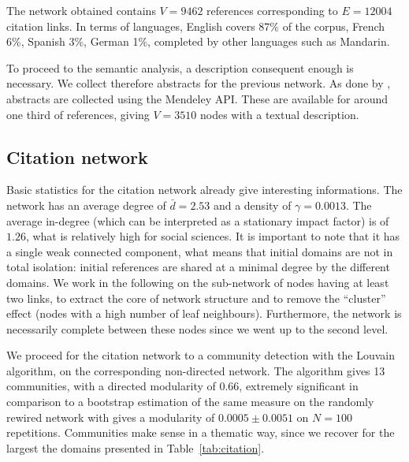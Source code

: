 \documentclass[10pt]{article}
\begin{document}
The network obtained contains $V=9462$ references corresponding to $E=12004$ citation links. In terms of languages, English covers 87\% of the corpus, French 6\%, Spanish 3\%, German 1\%, completed by other languages such as Mandarin.


To proceed to the semantic analysis, a description consequent enough is necessary. We collect therefore abstracts for the previous network. As done by \cite{raimbault2019exploration}, abstracts are collected using the Mendeley API. These are available for around one third of references, giving $V=3510$ nodes with a textual description.

\subsection{Citation network}

Basic statistics for the citation network already give interesting informations. The network has an average degree of $\bar{d}=2.53$ and a density of $\gamma=0.0013$. The average in-degree (which can be interpreted as a stationary impact factor) is of $1.26$, what is relatively high for social sciences. It is important to note that it has a single weak connected component, what means that initial domains are not in total isolation: initial references are shared at a minimal degree by the different domains. We work in the following on the sub-network of nodes having at least two links, to extract the core of network structure and to remove the ``cluster'' effect (nodes with a high number of leaf neighbours). Furthermore, the network is necessarily complete between these nodes since we went up to the second level.

We proceed for the citation network to a community detection with the Louvain algorithm, on the corresponding non-directed network. The algorithm gives 13 communities, with a directed modularity of 0.66, extremely significant in comparison to a bootstrap estimation of the same measure on the randomly rewired network with gives a modularity of $0.0005 \pm 0.0051$ on $N=100$ repetitions. Communities make sense in a thematic way, since we recover for the largest the domains presented in Table~\ref{tab:citation}.
\end{document}
